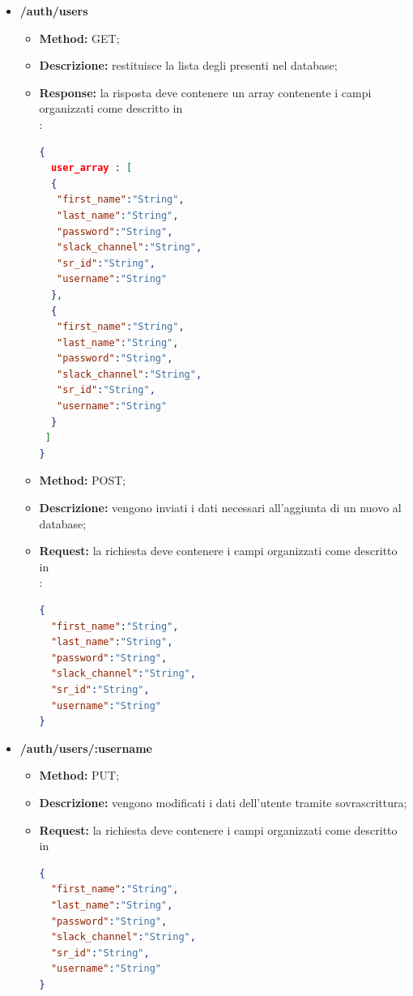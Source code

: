 \begin{itemize}
\item \textbf{/auth/users}\\
\begin{itemize}
\item \textbf{Method:} GET;
\item \textbf{Descrizione:} restituisce la lista degli  presenti nel database;  
\item \textbf{Response:} la risposta deve contenere un array contenente i campi organizzati come descritto in \\:
\begin{lstlisting}[language=json,firstnumber=1]
{
  user_array : [
  {
   "first_name":"String",
   "last_name":"String",
   "password":"String",
   "slack_channel":"String",
   "sr_id":"String",
   "username":"String"
  },
  {
   "first_name":"String",
   "last_name":"String",
   "password":"String",
   "slack_channel":"String",
   "sr_id":"String",
   "username":"String"
  }
 ]	
}
\end{lstlisting}
\end{itemize}

\begin{itemize}
\item \textbf{Method:} POST;
\item \textbf{Descrizione:} vengono inviati i dati necessari all'aggiunta di un nuovo  al database; 
\item \textbf{Request:} la richiesta deve contenere i campi organizzati come descritto in\\ :
\begin{lstlisting}[language=json,firstnumber=1]
{
  "first_name":"String",
  "last_name":"String",
  "password":"String",
  "slack_channel":"String",
  "sr_id":"String",
  "username":"String"
}
\end{lstlisting}
\end{itemize}

\item \textbf{/auth/users/:username}\\

\begin{itemize}
\item \textbf{Method:} PUT;
\item \textbf{Descrizione:} vengono modificati i dati dell'utente tramite sovrascrittura; 
\item \textbf{Request:} la richiesta deve contenere i campi organizzati come descritto in \\
\begin{lstlisting}[language=json,firstnumber=1]
{
  "first_name":"String",
  "last_name":"String",
  "password":"String",
  "slack_channel":"String",
  "sr_id":"String",
  "username":"String"	
}
\end{lstlisting}
\end{itemize}


\end{itemize}
